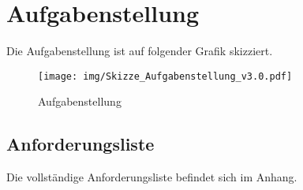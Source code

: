 \section{Aufgabenstellung}

Die Aufgabenstellung ist auf folgender Grafik skizziert.

\begin{figure}[H]
\centering
\texttt{[image: img/Skizze\_Aufgabenstellung\_v3.0.pdf]}
\caption{Aufgabenstellung}
\label{fig:aufgebanstellung}
\end{figure}

\subsection{Anforderungsliste}

Die vollständige Anforderungsliste befindet sich im Anhang.